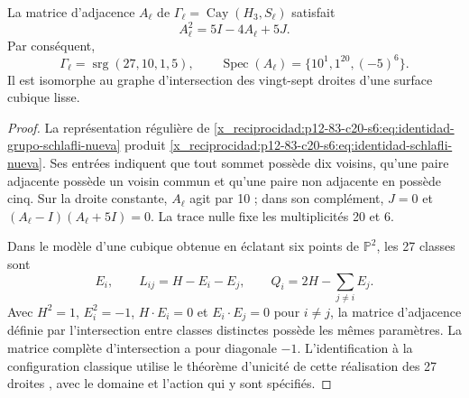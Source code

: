 \begin{theorem}
\label{x_reciprocidad:p12-83-c20-s6:thm:grafo-27-rectas-nuevo}
La matrice d’adjacence \(A_\ell\) de
\(\Gamma_\ell=\operatorname{Cay}(H_3,S_\ell)\) satisfait
\begin{equation}
 A_\ell^2=5I-4A_\ell+5J.
 \label{x_reciprocidad:p12-83-c20-s6:eq:identidad-schlafli-nueva}
\end{equation}
Par conséquent,
\[
 \Gamma_\ell=\operatorname{srg}(27,10,1,5),
 \qquad
 \operatorname{Spec}(A_\ell)=\{10^1,1^{20},(-5)^6\}.
\]
Il est isomorphe au graphe d'intersection des vingt-sept droites d'une surface cubique lisse.
\end{theorem}

\begin{proof}
La représentation régulière de
\cref{x_reciprocidad:p12-83-c20-s6:eq:identidad-grupo-schlafli-nueva} produit
\cref{x_reciprocidad:p12-83-c20-s6:eq:identidad-schlafli-nueva}. Ses entrées indiquent que tout sommet
possède dix voisins, qu’une paire adjacente possède un voisin commun et qu’une paire non
adjacente en possède cinq. Sur la droite constante, \(A_\ell\) agit par 10 ;
dans son complément, \(J=0\) et
\((A_\ell-I)(A_\ell+5I)=0\). La trace nulle fixe les multiplicités 20 et 6.

Dans le modèle d’une cubique obtenue en éclatant six points de
\(\mathbb P^2\), les 27 classes sont
\[
 E_i,\qquad L_{ij}=H-E_i-E_j,\qquad
 Q_i=2H-\sum_{j\ne i}E_j.
\]
Avec \(H^2=1\), \(E_i^2=-1\), \(H\cdot E_i=0\) et \(E_i\cdot E_j=0\) pour \(i\ne j\), la matrice d'adjacence définie par l'intersection entre classes distinctes possède les mêmes paramètres. La matrice complète d'intersection a pour diagonale \(-1\). L'identification à la configuration classique utilise le théorème d'unicité de cette réalisation des 27 droites \cite{x_reciprocidad:Manivel2005}, avec le domaine et l'action qui y sont spécifiés.
\end{proof}

